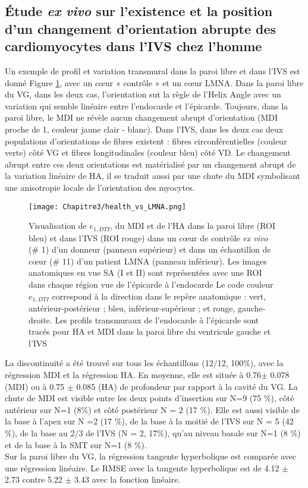 \subsection{Étude \textit{ex vivo} sur l’existence et la position d’un changement d’orientation abrupte des cardiomyocytes dans l’IVS chez l’homme}

Un exemple de profil et variation transmural dans la paroi libre et dans l’IVS est donné Figure \ref{fig:heathly_vs_LMNA}, avec un cœur « contrôle » et un cœur LMNA. Dans la paroi libre du VG, dans les deux cas, l’orientation sut la règle de l’Helix Angle avec un variation qui semble linéaire entre l’endocarde et l’épicarde. Toujours, dans la paroi libre, le MDI ne révèle aucun changement abrupt d’orientation (MDI proche de 1, couleur jaune clair - blanc). 
Dans l’IVS, dans les deux cas deux populations d’orientations de fibres existent : fibres circonférentielles (couleur verte) côté VG et fibres longitudinales (couleur bleu) côté VD. Le changement abrupt entre ces deux orientations est matérialisé par un changement abrupt de la variation linéaire de HA, il se traduit aussi par une chute du MDI symbolisant une anisotropie locale de l’orientation des myocytes.

\begin{figure}[!ht]
  \begin{center}
    \texttt{[image: Chapitre3/health\_vs\_LMNA.png]}
  \end{center}
  \caption{Visualisation de $e_{1,DTI}$, du MDI et de l’HA dans la paroi libre (ROI bleu) et dans l'IVS (ROI rouge) dans un cœur de contrôle \textit{ex vivo} (\# 1) d'un donneur (panneau supérieur) et dans un échantillon de cœur (\# 11) d'un patient LMNA (panneau inférieur). Les images anatomiques en vue SA (I et II) sont représentées avec une ROI dans chaque région vue de l'épicarde à l'endocarde Le code couleur $e_{1,DTI}$ correspond à la direction dans le repère anatomique : vert, antérieur-postérieur ; bleu, inférieur-supérieur ; et rouge, gauche-droite. Les profils transmuraux de l'endocarde à l'épicarde sont tracés pour HA et MDI dans la paroi libre du ventricule gauche et l'IVS}
  \label{fig:heathly_vs_LMNA}
\end{figure}

La discontinuité a été trouvé sur tous les échantillons (12/12, 100\%), avec la régression MDI et la régression HA. En moyenne, elle est située à 0.76$ \pm$ 0.078 (MDI) ou à 0.75 $\pm$ 0.085 (HA) de profondeur par rapport à la cavité du VG. La chute de MDI est visible entre les deux points d’insertion sur N=9 (75 \%), côté antérieur sur N=1 (8\%) et côté postérieur N = 2 (17 \%). Elle est aussi visible de la base à l’apex sur N =2 (17 \%), de la base à la moitié de l’IVS sur N = 5 (42 \%), de la base au 2/3 de l’IVS (N = 2, 17\%), qu’au niveau basale sur N=1 (8 \%) et de la base à la SMT sur N=1 (8 \%).
\\
Sur la paroi libre du VG, la régression tangente hyperbolique est comparée avec une régression linéaire. Le RMSE avec la tangente hyperbolique est de 4.12 $\pm$ 2.73 contre 5.22 $\pm$ 3.43 avec la fonction linéaire. 
\clearpage

